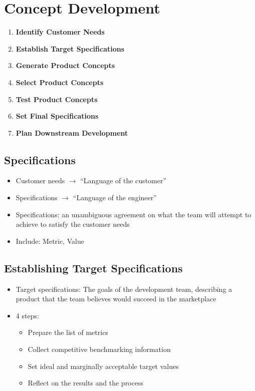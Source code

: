 \documentclass[openany,12pt,a4paper]{book}
\begin{document}
\chapter{Concept Development}
\begin{enumerate}
    \item \textbf{Identify Customer Needs}
    \item \textbf{Establish Target Specifications}
    \item \textbf{Generate Product Concepts}
    \item \textbf{Select Product Concepts}
    \item \textbf{Test Product Concepts}
    \item \textbf{Set Final Specifications}
    \item \textbf{Plan Downstream Development}
\end{enumerate}
\section{Specifications}
\begin{itemize}
    \item Customer needs $\to$ ``Language of the customer''
    \item Specifications $\to$ ``Language of the engineer''
    \item Specifications: an unambiguous agreement on what the team will attempt to achieve to satisfy the customer needs
    \item Include: Metric, Value
\end{itemize}
\section{Establishing Target Specifications}
\begin{itemize}
    \item Target specifications: The goals of the development team, describing a product that the team believes would succeed in the marketplace
    \item 4 steps:
    \begin{itemize}
        \item Prepare the list of metrics
        \item Collect competitive benchmarking information
        \item Set ideal and marginally acceptable target values
        \item Reflect on the results and the process
    \end{itemize}
\end{itemize}
\end{document}
